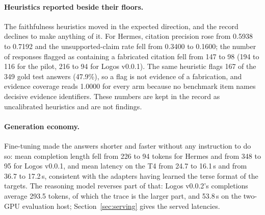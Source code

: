 \paragraph{Heuristics reported beside their floors.}
The faithfulness heuristics moved in the expected direction, and the record declines to make anything of it. For Hermes, citation precision rose from 0.5938 to 0.7192 and the unsupported-claim rate fell from 0.3400 to 0.1600; the number of responses flagged as containing a fabricated citation fell from 147 to 98 (194 to 116 for the pilot, 216 to 94 for Logos v0.0.1). The same heuristic flags 167 of the 349 gold test answers (47.9\%), so a flag is not evidence of a fabrication, and evidence coverage reads 1.0000 for every arm because no benchmark item names decisive evidence identifiers. These numbers are kept in the record as uncalibrated heuristics and are not findings.

\paragraph{Generation economy.}
Fine-tuning made the answers shorter and faster without any instruction to do so: mean completion length fell from 226 to 94 tokens for Hermes and from 348 to 95 for Logos v0.0.1, and mean latency on the T4 from 24.7 to 16.1\,s and from 36.7 to 17.2\,s, consistent with the adapters having learned the terse format of the targets. The reasoning model reverses part of that: Logos v0.0.2's completions average 293.5 tokens, of which the trace is the larger part, and 53.8\,s on the two-GPU evaluation host; Section~\ref{sec:serving} gives the served latencies.
